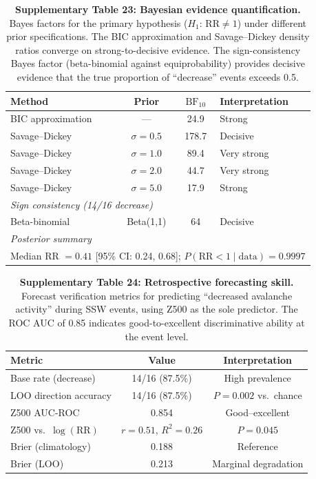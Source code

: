 \begin{table}[!ht]
\centering
\caption{\textbf{Supplementary Table 23: Bayesian evidence quantification.}
Bayes factors for the primary hypothesis ($H_1$: $\mathrm{RR} \neq 1$) under different prior specifications. The BIC approximation and Savage--Dickey density ratios converge on strong-to-decisive evidence. The sign-consistency Bayes factor (beta-binomial against equiprobability) provides decisive evidence that the true proportion of ``decrease'' events exceeds 0.5.}
\label{tab:bayesian}
\small
\begin{tabular}{lccl}
\toprule
Method & Prior & $\mathrm{BF}_{10}$ & Interpretation \\
\midrule
BIC approximation & --- & 24.9 & Strong \\
Savage--Dickey & $\sigma = 0.5$ & 178.7 & Decisive \\
Savage--Dickey & $\sigma = 1.0$ & 89.4 & Very strong \\
Savage--Dickey & $\sigma = 2.0$ & 44.7 & Very strong \\
Savage--Dickey & $\sigma = 5.0$ & 17.9 & Strong \\
\midrule
\multicolumn{4}{l}{\textit{Sign consistency (14/16 decrease)}} \\
Beta-binomial & Beta(1,1) & 64 & Decisive \\
\midrule
\multicolumn{4}{l}{\textit{Posterior summary}} \\
\multicolumn{4}{l}{Median RR $= 0.41$ [95\% CI: 0.24, 0.68]; $P(\mathrm{RR} < 1 \mid \mathrm{data}) = 0.9997$} \\
\bottomrule
\end{tabular}
\end{table}

\begin{table}[!ht]
\centering
\caption{\textbf{Supplementary Table 24: Retrospective forecasting skill.}
Forecast verification metrics for predicting ``decreased avalanche activity'' during SSW events, using Z500 as the sole predictor. The ROC AUC of 0.85 indicates good-to-excellent discriminative ability at the event level.}
\label{tab:forecast_skill}
\small
\begin{tabular}{lcc}
\toprule
Metric & Value & Interpretation \\
\midrule
Base rate (decrease) & 14/16 (87.5\%) & High prevalence \\
LOO direction accuracy & 14/16 (87.5\%) & $P = 0.002$ vs.\ chance \\
Z500 AUC-ROC & 0.854 & Good--excellent \\
Z500 vs.\ $\log(\mathrm{RR})$ & $r = 0.51$, $R^2 = 0.26$ & $P = 0.045$ \\
Brier (climatology) & 0.188 & Reference \\
Brier (LOO) & 0.213 & Marginal degradation \\
\bottomrule
\end{tabular}
\end{table}

